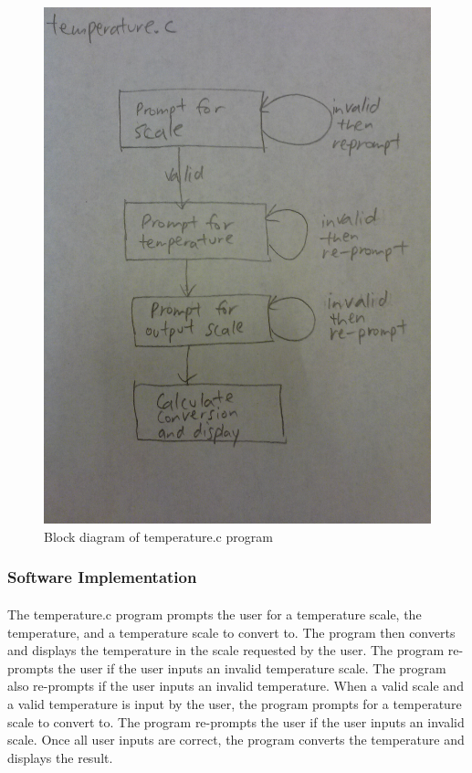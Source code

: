 \documentclass{article}
\begin{document}
  \begin{figure}[H]
    \centering
    \includegraphics[width=0.75\linewidth]{figures/c/temp_blockdiagram.jpg}
    \caption{Block diagram of temperature.c program}
    \label{fig:temp_blockdiagram}
  \end{figure}


  \subsubsection{Software Implementation}
  \paragraph{} The temperature.c program prompts the user for a temperature scale, the temperature, and a temperature scale to convert to. The program then converts and displays the temperature in the scale requested by the user. The program re-prompts the user if the user inputs an invalid temperature scale. The program also re-prompts if the user inputs an invalid temperature. When a valid scale and a valid temperature is input by the user, the program prompts for a temperature scale to convert to. The program re-prompts the user if the user inputs an invalid scale. Once all user inputs are correct, the program converts the temperature and displays the result.
\end{document}
